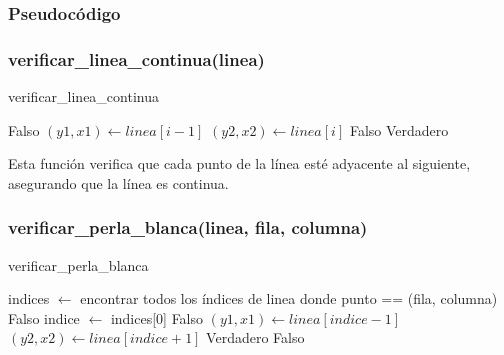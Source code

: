 \documentclass{article}
\begin{document}
 



\subsubsection{Pseudocódigo}

\subsubsection{verificar\_linea\_continua(linea)}

\begin{algorithm}[H]
\caption{verificar\_linea\_continua}
\begin{algorithmic}[1]
        \State \Return Falso
    \EndIf
        \State $(y1, x1) \leftarrow linea[i - 1]$
        \State $(y2, x2) \leftarrow linea[i]$
            \State \Return Falso
        \EndIf
    \EndFor
    \State \Return Verdadero
\EndProcedure
\end{algorithmic}
\end{algorithm}

Esta función verifica que cada punto de la línea esté adyacente al siguiente, asegurando que la línea es continua.

\subsubsection{verificar\_perla\_blanca(linea, fila, columna)}

\begin{algorithm}[H]
\caption{verificar\_perla\_blanca}
\begin{algorithmic}[1]
    \State indices $\leftarrow$ encontrar todos los índices de linea donde punto == (fila, columna)
        \State \Return Falso
    \EndIf
    \State indice $\leftarrow$ indices[0]
        \State \Return Falso
    \EndIf
    \State $(y1, x1) \leftarrow linea[indice - 1]$
    \State $(y2, x2) \leftarrow linea[indice + 1]$
        \State \Return Verdadero
    \EndIf
    \State \Return Falso
\EndProcedure
\end{algorithmic}
\end{algorithm}
\end{document}
